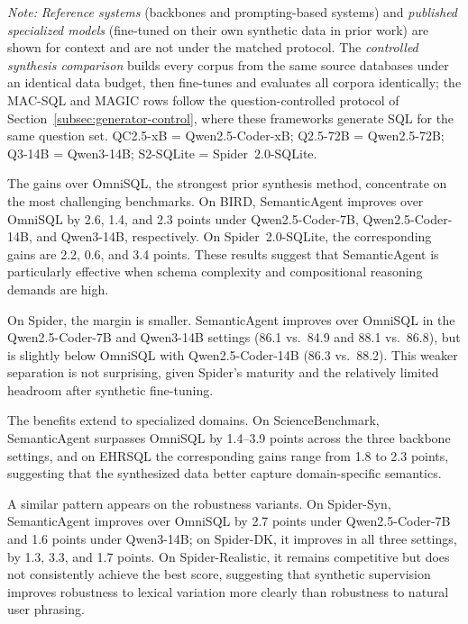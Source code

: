 \documentclass[letterpaper,journal]{IEEEtran}
\begin{document}
\begin{table}[t]
\vspace{1mm}
\begin{minipage}{\textwidth}
\footnotesize
\textit{Note:} \emph{Reference systems} (backbones and prompting-based systems) and \emph{published specialized models} (fine-tuned on their own synthetic data in prior work) are shown for context and are not under the matched protocol. The \emph{controlled synthesis comparison} builds every corpus from the same source databases under an identical data budget, then fine-tunes and evaluates all corpora identically; the MAC-SQL and MAGIC rows follow the question-controlled protocol of Section~\ref{subsec:generator-control}, where these frameworks generate SQL for the same question set. QC2.5-xB = Qwen2.5-Coder-xB; Q2.5-72B = Qwen2.5-72B; Q3-14B = Qwen3-14B; S2-SQLite = Spider~2.0-SQLite.
\end{minipage}

\vspace{-2mm}
\end{table}


The gains over OmniSQL, the strongest prior synthesis method, concentrate on the most challenging benchmarks. On BIRD, SemanticAgent improves over OmniSQL by 2.6, 1.4, and 2.3 points under Qwen2.5-Coder-7B, Qwen2.5-Coder-14B, and Qwen3-14B, respectively. On Spider~2.0-SQLite, the corresponding gains are 2.2, 0.6, and 3.4 points. These results suggest that SemanticAgent is particularly effective when schema complexity and compositional reasoning demands are high.

On Spider, the margin is smaller. SemanticAgent improves over OmniSQL in the Qwen2.5-Coder-7B and Qwen3-14B settings (86.1 vs.\ 84.9 and 88.1 vs.\ 86.8), but is slightly below OmniSQL with Qwen2.5-Coder-14B (86.3 vs.\ 88.2). This weaker separation is not surprising, given Spider's maturity and the relatively limited headroom after synthetic fine-tuning.

The benefits extend to specialized domains. On ScienceBenchmark, SemanticAgent surpasses OmniSQL by 1.4--3.9 points across the three backbone settings, and on EHRSQL the corresponding gains range from 1.8 to 2.3 points, suggesting that the synthesized data better capture domain-specific semantics.

A similar pattern appears on the robustness variants. On Spider-Syn, SemanticAgent improves over OmniSQL by 2.7 points under Qwen2.5-Coder-7B and 1.6 points under Qwen3-14B; on Spider-DK, it improves in all three settings, by 1.3, 3.3, and 1.7 points. On Spider-Realistic, it remains competitive but does not consistently achieve the best score, suggesting that synthetic supervision improves robustness to lexical variation more clearly than robustness to natural user phrasing.
\end{document}
